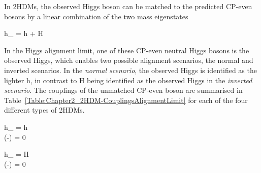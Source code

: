 In 2HDMs, the observed Higgs boson can be matched to the predicted CP-even bosons by a linear combination of the two mass eigenstates 

\begin{equation_pad}
    h_{} = \sin{(\beta - \alpha)} h + \cos{(\beta - \alpha)} H 
\end{equation_pad}

In the Higgs alignment limit, one of these CP-even neutral Higgs bosons is the observed Higgs, which enables two possible alignment scenarios, the normal and inverted scenarios. In the \textit{normal scenario}, the observed Higgs is identified as the lighter h, in contrast to H being identified as the observed Higgs in the \textit{inverted scenario}. The couplings of the unmatched CP-even boson are summarised in Table~\ref{Table:Chapter2_2HDM-CouplingsAlignmentLimit} for each of the four different types of 2HDMs.

\begin{equation_pad}
\begin{rcases}
  h_{} = h \\
  \cos(\beta-\alpha) = 0 
\quad \end{rcases}
\quad {}
\label{Equation:Chapter2-NormalScenario}
\end{equation_pad}

\begin{equation_pad}
\begin{rcases}
  h_{} = H \\
  \sin(\beta-\alpha) = 0
\quad \end{rcases}
\quad {}
\label{Equation:Chapter2-InvertedScenario}
\end{equation_pad}

